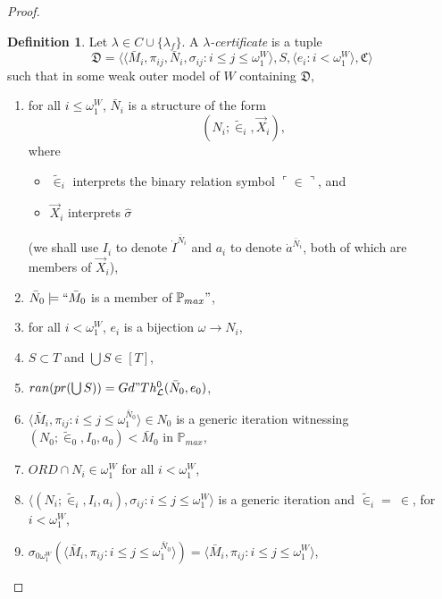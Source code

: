\documentclass[12pt, twoside]{memoir}
\numberwithin{equation}{section}
\theoremstyle{definition}
\newtheorem{defi}[thm]{Definition}
\theoremstyle{remark}
\theoremstyle{definition}
\theoremstyle{definition}
\theoremstyle{definition}
\theoremstyle{remark}
\begin{document}
\begin{proof}
\begin{defi}\label{def437}
Let $\lambda \in C \cup \{\lambda_f\}$. A $\lambda$\emph{-certificate} is a tuple 
\begin{equation*}
    \mathfrak{D} = \langle \langle \bar{M}_i, \pi_{ij},  \bar{N}_i, \sigma_{ij} : i \leq j \leq \omega_1^{W} \rangle, S, \langle e_i : i < \omega_1^W \rangle, \mathfrak{C} \rangle
\end{equation*}
such that in some weak outer model of $W$ containing $\mathfrak{D}$,
\begin{enumerate}[label=(C\arabic*)$_{\lambda}$, leftmargin=40pt]
    \item\label{cd0} for all $i \leq \omega_1^W$, $\bar{N}_i$ is a structure of the form
    \begin{equation*}
        (N_i; \tilde{\in}_i, \Vec{X}_i) \text{,}
    \end{equation*}
    where 
    \begin{itemize}
        \item $\tilde{\in}_i$ interprets the binary relation symbol $\ulcorner \in \urcorner$, and
        \item $\Vec{X}_i$ interprets $\hat{\sigma}$ 
    \end{itemize}
    (we shall use $I_i$ to denote $\dot{I}^{\bar{N}_i}$ and $a_i$ to denote $\dot{a}^{\bar{N}_i}$, both of which are members of $\Vec{X}_i$),
    \item\label{cd1} $\bar{N}_0 \models ``\bar{M}_0$ is a member of $\mathbb{P}_{max}"$,
    \item\label{cd1.5} for all $i < \omega_1^W$, $e_i$ is a bijection $\omega \longrightarrow N_i$,
    \item\label{cd2} $S \subset T$ and $\bigcup S \in [T]$,
    \item\label{cd3} $ran(pr(\bigcup S)) = Gd" Th^0_{\mathcal{L}}(\bar{N}_0, e_0)$,
    \item\label{cd4} $\langle \bar{M}_i, \pi_{ij} : i \leq j \leq \omega_1^{\bar{N}_0} \rangle \in N_0$ is a generic iteration witnessing $(N_0; \tilde{\in}_0, I_0, a_0) < \bar{M}_0$ in $\mathbb{P}_{max}$,
    \item\label{cdnew} $ORD \cap N_i \in \omega_1^W$ for all $i < \omega_1^W$,
    \item\label{cd5} $\langle (N_i; \tilde{\in}_i, I_i, a_i), \sigma_{ij} : i \leq  j \leq \omega_1^{W} \rangle$ is a generic iteration and $\tilde{\in}_i = \ \in$, for $i < \omega_1^W$,
    \item\label{cd6} $\sigma_{0\omega_1^W}(\langle \bar{M}_i, \pi_{ij} : i \leq j \leq \omega_1^{\bar{N}_0} \rangle) = \langle \bar{M}_i, \pi_{ij} : i \leq j \leq \omega_1^W \rangle$, 

\end{enumerate}
\end{defi}
\end{proof}
\end{document}
